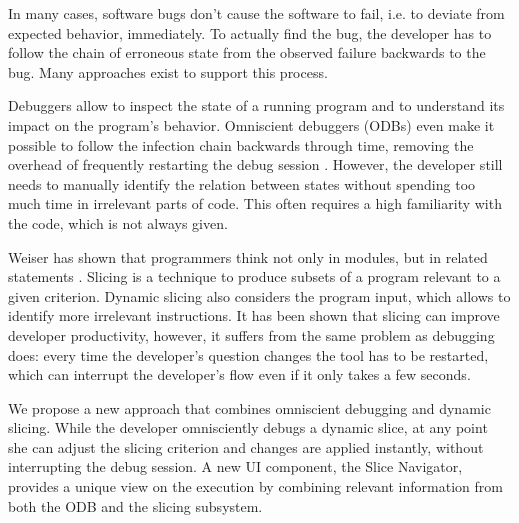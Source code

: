 ﻿\documentclass[
      english,
      ]{llncs}
\begin{document}
In many cases, software bugs don't cause the software to fail, i.e. to deviate from expected behavior, immediately.
To actually find the bug, the developer has to follow the chain of erroneous state from the observed failure backwards to the bug.
Many approaches exist to support this process.

Debuggers allow to inspect the state of a running program and to understand its impact on the program's behavior.
Omniscient debuggers (ODBs) even make it possible to follow the infection chain backwards through time, removing the overhead of frequently restarting the debug session \cite{lewis_debugging_2003}.
However, the developer still needs to manually identify the relation between states without spending too much time in irrelevant parts of code.
This often requires a high familiarity with the code, which is not always given.
%

Weiser has shown that programmers think not only in modules, but in related statements \cite{weiser_programmers_1982}.
Slicing is a technique to produce subsets of a program relevant to a given criterion.
Dynamic slicing also considers the program input, which allows to identify more irrelevant instructions.
It has been shown that slicing can improve developer productivity, however, it suffers from the same problem as debugging does:
every time the developer's question changes the tool has to be restarted, which can interrupt the developer's flow even if it only takes a few seconds.

We propose a new approach that combines omniscient debugging and dynamic slicing.
While the developer omnisciently debugs a dynamic slice, at any point she can adjust the slicing criterion and changes are applied instantly, without interrupting the debug session.
A new UI component, the Slice Navigator, provides a unique view on the execution by combining relevant information from both the ODB and the slicing subsystem.

\end{document}
